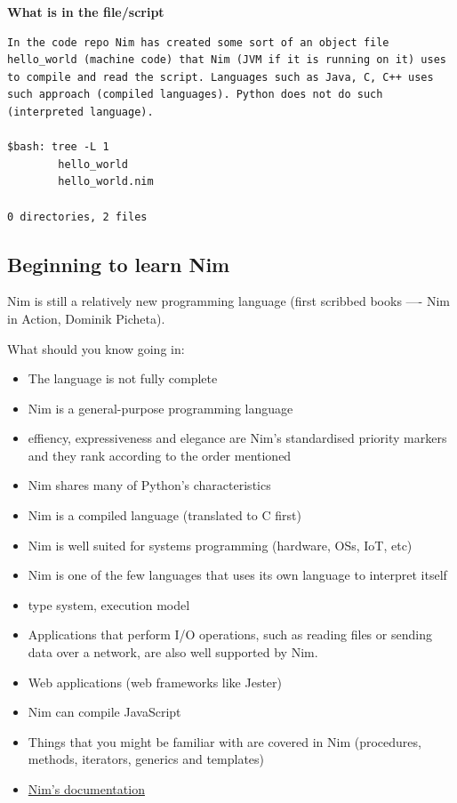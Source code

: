 \documentclass[10pt, a4paper, twocolumn]{article} %
\begin{document}
\textbf{What is in the file/script}

\begin{lstlisting}
In the code repo Nim has created some sort of an object file hello_world (machine code) that Nim (JVM if it is running on it) uses to compile and read the script. Languages such as Java, C, C++ uses such approach (compiled languages). Python does not do such (interpreted language).

$bash: tree -L 1
		hello_world
		hello_world.nim

0 directories, 2 files
\end{lstlisting}


\subsection{Beginning to learn Nim}

Nim is still a relatively new programming language (first scribbed books ---- Nim in Action, Dominik Picheta).

What should you know going in:
\begin{itemize}
	\item The language is not fully complete
	\item Nim is a general-purpose programming language
	\item effiency, expressiveness and elegance are Nim's standardised priority markers and they rank according to the order mentioned
	\item Nim shares many of Python's characteristics
	\item Nim is a compiled language (translated to C first)
	\item Nim is well suited for systems programming (hardware, OSs, IoT, etc)
	\item Nim is one of the few languages that uses its own language to interpret itself
	\item type system, execution model
	\item Applications that perform I/O operations, such as reading files or sending data over a network, are also well supported by Nim.
	\item Web applications (web frameworks like Jester)
	\item Nim can compile JavaScript
	\item Things that you might be familiar with are covered in Nim (procedures, methods, iterators, generics and templates)
	\item \href{https://github.com/nim-lang/Nim#contributing}{Nim's documentation}
\end{itemize}
\end{document}

